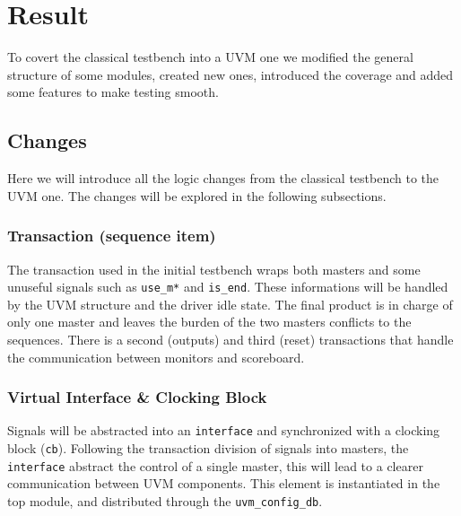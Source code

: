 \chapter{Result} 
\label{cha:result}

To covert the classical testbench into a UVM one we modified the general structure of some modules, created new ones, introduced the coverage and added some features to make testing smooth.

\section{Changes}

Here we will introduce all the logic changes from the classical testbench to the UVM one.
The changes will be explored in the following subsections.

\subsection*{Transaction (sequence item)}

The transaction used in the initial testbench wraps both masters and some unuseful signals such as \texttt{use\_m*} and \texttt{is\_end}.
These informations will be handled by the UVM structure and the driver idle state.
The final product is in charge of only one master and leaves the burden of the two masters conflicts to the sequences.
There is a second (outputs) and third (reset) transactions that handle the communication between monitors and scoreboard.

\subsection*{Virtual Interface \& Clocking Block}

Signals will be abstracted into an \texttt{interface} and synchronized with a clocking block (\texttt{cb}).
Following the transaction division of signals into masters, the \texttt{interface} abstract the control of a single master, this will lead to a clearer communication between UVM components.
This element is instantiated in the top module, and distributed through the \texttt{uvm\_config\_db}.



